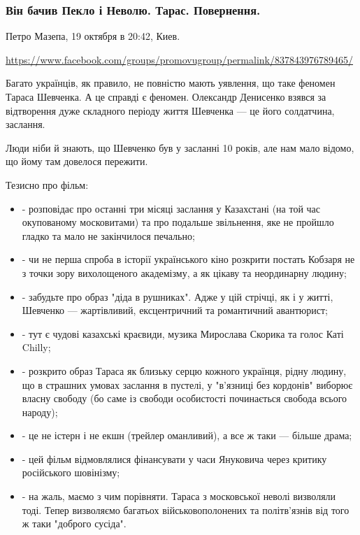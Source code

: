  
 

\subsubsection{Він бачив Пекло і Неволю. Тарас. Повернення.}

Петро Мазепа, 19 октября в 20:42, Киев.

\url{https://www.facebook.com/groups/promovugroup/permalink/837843976789465/}

Багато українців, як правило, не повністю мають уявлення, що таке феномен
Тараса Шевченка. А це справді є феномен. Олександр Денисенко взявся за
відтворення дуже складного періоду життя Шевченка — це його солдатчина,
заслання.

Люди ніби й знають, що Шевченко був у засланні 10 років, але нам мало відомо,
що йому там довелося пережити.

Тезисно про фільм:

\begin{itemize}
\item - розповідає про останні три місяці заслання у Казахстані (на той час окупованому московитами) та про подальше звільнення, яке не пройшло гладко та мало не закінчилося печально;

\item - чи не перша спроба в історії українського кіно розкрити постать Кобзаря не з точки зору вихолощеного академізму, а як цікаву та неординарну людину;

\item - забудьте про образ "діда в рушниках". Адже у цій стрічці, як і у житті, Шевченко — жартівливий, ексцентричний та романтичний авантюрист;

\item - тут є чудові казахські краєвиди, музика Мирослава Скорика та голос Каті Chilly;
\item - розкрито образ Тараса як близьку серцю кожного українця, рідну людину, що в
страшних умовах заслання в пустелі, у "в'язниці без кордонів" виборює власну
свободу (бо саме із свободи особистості починається свобода всього народу);

\item - це не істерн і не екшн (трейлер оманливий), а все ж таки — більше драма;
\item - цей фільм відмовлялися фінансувати у часи Януковича через критику російського шовінізму;
\item - на жаль, маємо з чим порівняти. Тараса з московської неволі визволяли
				тоді.  Тепер визволяємо багатьох військовополонених та політв'язнів від
								того ж таки "доброго сусіда".
\end{itemize}

